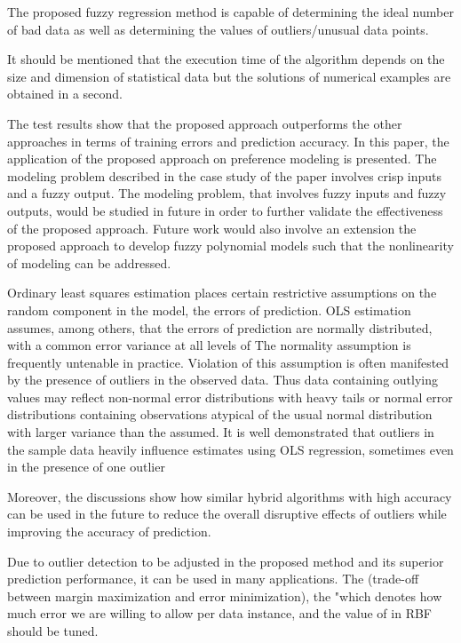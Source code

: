 \documentclass{IJFS}
\begin{document}
The proposed fuzzy regression method is capable of determining  the ideal number of bad data as well as determining the values of outliers/unusual data points.

It should be mentioned that the execution time of the algorithm depends on the size and dimension of statistical data but the solutions of numerical examples are obtained in a second.

The test results show that the
proposed approach outperforms the other approaches in terms of training errors and
prediction accuracy. In this paper, the application of the proposed approach on preference
modeling is presented.
The modeling problem described in the case study of the paper involves
crisp inputs and a fuzzy output. The modeling problem, that involves fuzzy inputs and fuzzy outputs, would be studied in future in order to further validate the effectiveness of the proposed approach. Future work would also involve an extension the proposed approach to
develop fuzzy polynomial models such that the nonlinearity of modeling can be addressed.

Ordinary least squares estimation places certain restrictive assumptions on
the random component in the model, the errors of prediction. OLS estimation
assumes, among others, that the errors of prediction are normally distributed, with
a common error variance at all levels of   The normality
assumption is frequently untenable in practice. Violation of this assumption is
often manifested by the presence of outliers in the observed data. Thus data containing outlying values may reflect non-normal error
distributions with heavy tails or normal error distributions containing observations atypical of the usual normal distribution with larger variance than the assumed.
It is well demonstrated that outliers in the sample data heavily influence estimates
using OLS regression, sometimes even in the presence of one outlier


Moreover, the discussions show how similar hybrid algorithms with high accuracy can be used in the future to reduce the overall disruptive effects of outliers while improving the accuracy of prediction.

Due to outlier detection to be adjusted in the proposed method and its superior prediction performance, it can be used in many applications.
The (trade-off between margin maximization and error minimization), the "which denotes how much error we are willing to allow per data instance, and the value of in RBF should be tuned.
\end{document}
